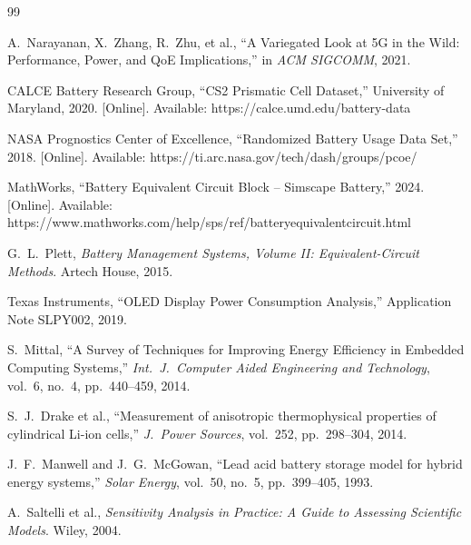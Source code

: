 \documentclass[12pt]{article}
\begin{document}
\newpage
\begin{thebibliography}{99}

A.~Narayanan, X.~Zhang, R.~Zhu, et al., ``A Variegated Look at 5G in the Wild: Performance, Power, and QoE Implications,'' in \textit{ACM SIGCOMM}, 2021.

CALCE Battery Research Group, ``CS2 Prismatic Cell Dataset,'' University of Maryland, 2020. [Online]. Available: https://calce.umd.edu/battery-data

NASA Prognostics Center of Excellence, ``Randomized Battery Usage Data Set,'' 2018. [Online]. Available: https://ti.arc.nasa.gov/tech/dash/groups/pcoe/

MathWorks, ``Battery Equivalent Circuit Block -- Simscape Battery,'' 2024. [Online]. Available: https://www.mathworks.com/help/sps/ref/batteryequivalentcircuit.html

G.~L.~Plett, \textit{Battery Management Systems, Volume II: Equivalent-Circuit Methods}. Artech House, 2015.

Texas Instruments, ``OLED Display Power Consumption Analysis,'' Application Note SLPY002, 2019.

S.~Mittal, ``A Survey of Techniques for Improving Energy Efficiency in Embedded Computing Systems,'' \textit{Int.~J.~Computer Aided Engineering and Technology}, vol.~6, no.~4, pp.~440--459, 2014.

S.~J.~Drake et al., ``Measurement of anisotropic thermophysical properties of cylindrical Li-ion cells,'' \textit{J.~Power Sources}, vol.~252, pp.~298--304, 2014.

J.~F.~Manwell and J.~G.~McGowan, ``Lead acid battery storage model for hybrid energy systems,'' \textit{Solar Energy}, vol.~50, no.~5, pp.~399--405, 1993.

A.~Saltelli et al., \textit{Sensitivity Analysis in Practice: A Guide to Assessing Scientific Models}. Wiley, 2004.

\end{thebibliography}
\end{document}
